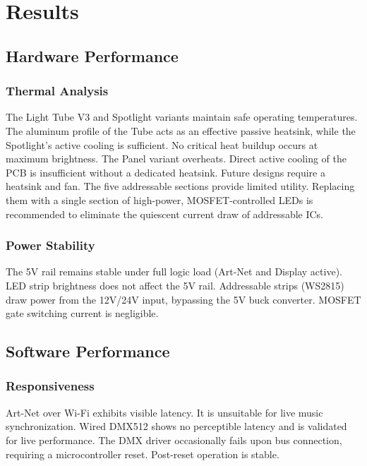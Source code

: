 \section{Results}
\label{sec:results}
\subsection{Hardware Performance}
\label{subsec:hardware_performance}

\subsubsection{Thermal Analysis}
\label{subsec:thermal_analysis}
The Light Tube V3 and Spotlight variants maintain safe operating temperatures.
The aluminum profile of the Tube acts as an effective passive heatsink, while the Spotlight's active cooling is sufficient.
No critical heat buildup occurs at maximum brightness.
The Panel variant overheats.
Direct active cooling of the PCB is insufficient without a dedicated heatsink.
Future designs require a heatsink and fan.
The five addressable sections provide limited utility.
Replacing them with a single section of high-power, MOSFET-controlled LEDs is recommended to eliminate the quiescent current draw of addressable ICs.

\subsubsection{Power Stability}
\label{subsec:power_stability}
The 5V rail remains stable under full logic load (Art-Net and Display active).
LED strip brightness does not affect the 5V rail.
Addressable strips (WS2815) draw power from the 12V/24V input, bypassing the 5V buck converter.
MOSFET gate switching current is negligible.

\subsection{Software Performance}
\label{subsec:software_performance}
\subsubsection{Responsiveness}
\label{subsec:responsiveness}
Art-Net over Wi-Fi exhibits visible latency.
It is unsuitable for live music synchronization.
Wired DMX512 shows no perceptible latency and is validated for live performance.
The DMX driver occasionally fails upon bus connection, requiring a microcontroller reset.
Post-reset operation is stable.

